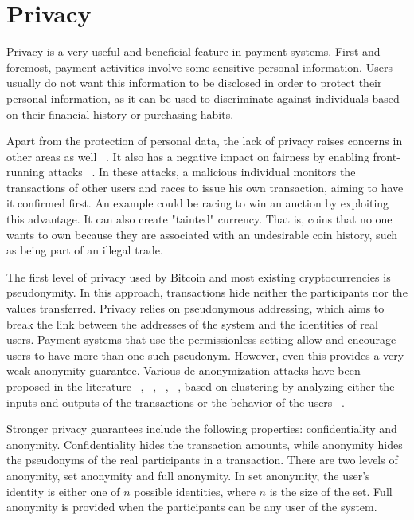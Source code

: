 \section{Privacy}

Privacy is a very useful and beneficial feature in payment systems. First and foremost, payment activities involve some sensitive personal information. Users usually do not want this information to be disclosed in order to protect their personal information, as it can be used to discriminate against individuals based on their financial history or purchasing habits. 

Apart from the protection of personal data, the lack of privacy raises concerns in other areas as well ~\cite{SoKPrivacyPreservingComputing}.
It also has a negative impact on fairness by enabling front-running attacks ~\cite{FronRrunningAttacks}. In these attacks, a malicious individual monitors the transactions of other users and races to issue his own transaction, aiming to have it confirmed first. An example could be racing to win an auction by exploiting this advantage. It can also create "tainted" currency. That is, coins that no one wants to own because they are associated with an undesirable coin history, such as being part of an illegal trade.

The first level of privacy used by Bitcoin and most existing cryptocurrencies is pseudonymity. In this approach, transactions hide neither the participants nor the values transferred. Privacy relies on pseudonymous addressing, which aims to break the link between the addresses of the system and the identities of real users. Payment systems that use the permissionless setting allow and encourage users to have more than one such pseudonym. However, even this provides a very weak anonymity guarantee. Various de-anonymization attacks have been proposed in the literature ~\cite{meiklejohn2013fistful}, ~\cite{reid2013analysis}, ~\cite{ron2013quantitative}, ~\cite{tschorsch2016bitcoin}, based on clustering by analyzing either the inputs and outputs of the transactions or the behavior of the users ~\cite{SoKAnonymityInCryptocurrencies}.

Stronger privacy guarantees include the following properties: confidentiality and anonymity. Confidentiality hides the transaction amounts, while anonymity hides the pseudonyms of the real participants in a transaction. There are two levels of anonymity, set anonymity and full anonymity. In set anonymity, the user's identity is either one of $n$ possible identities, where $n$ is the size of the set. Full anonymity is provided when the participants can be any user of the system.

